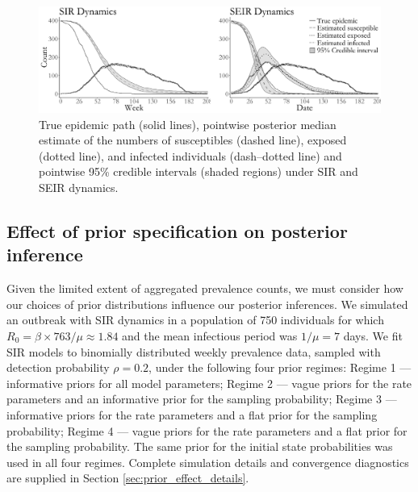 \begin{figure}[!h]
	\centering
	\includegraphics[width=0.9\linewidth]{figures/misspec_latent_posts.pdf}
	\caption{True epidemic path (solid lines), pointwise posterior median estimate of the numbers of susceptibles (dashed line), exposed (dotted line), and infected individuals (dash--dotted line) and pointwise 95\% credible intervals (shaded regions) under SIR and SEIR dynamics.}
	\label{fig:misspec_latent_posts}
\end{figure}

\subsection{Effect of prior specification on posterior inference}
\label{subsec:prior_effect_sim}
Given the limited extent of aggregated prevalence counts, we must consider how our choices of prior distributions influence our posterior inferences. We simulated an outbreak with SIR dynamics in a population of 750 individuals for which $ R_0 = \beta \times 763 / \mu \approx 1.84 $ and the mean infectious period was $ 1/\mu = 7 $ days. We fit SIR models to binomially distributed weekly prevalence data, sampled with detection probability $ \rho = 0.2$, under the following four prior regimes: Regime 1 --- informative priors for all model parameters; Regime 2 --- vague priors for the rate parameters and an informative prior for the sampling probability; Regime 3 --- informative priors for the rate parameters and a flat prior for the sampling probability; Regime 4 --- vague priors for the rate parameters and a flat prior for the sampling probability. The same prior for the initial state probabilities was used in all four regimes. Complete simulation details and convergence diagnostics are supplied in Section \ref{sec:prior_effect_details}.

